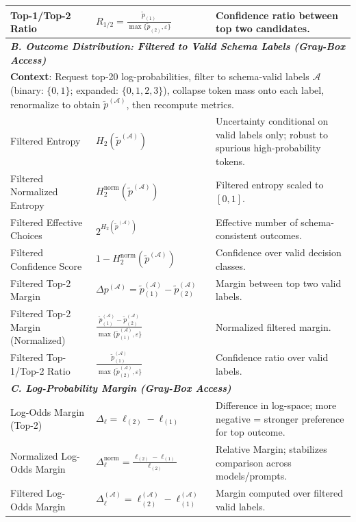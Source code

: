 \begin{table}[t]
\begin{tabular}{p{4.0cm} p{4.8cm} p{8.2cm}}
Top-1/Top-2 Ratio & $R_{1/2} = \frac{\tilde{p}_{(1)}}{\max\{\tilde{p}_{(2)}, \varepsilon\}}$ & Confidence ratio between top two candidates. \\
\midrule
\multicolumn{3}{l}{\textit{\textbf{B. Outcome Distribution: Filtered to Valid Schema Labels (Gray-Box Access)}}} \\
\multicolumn{3}{p{17.0cm}}{\small \textbf{Context}: Request top-20 log-probabilities, filter to schema-valid labels $\mathcal{A}$ (binary: $\{0,1\}$; expanded: $\{0,1,2,3\}$), collapse token mass onto each label, renormalize to obtain $\tilde{p}^{(\mathcal{A})}$, then recompute metrics.} \\[0.5ex]
\hdashline
Filtered Entropy & $H_2(\tilde{p}^{(\mathcal{A})})$ & Uncertainty conditional on valid labels only; robust to spurious high-probability tokens. \\
Filtered Normalized Entropy & $H_2^{\text{norm}}(\tilde{p}^{(\mathcal{A})})$ & Filtered entropy scaled to $[0,1]$. \\
Filtered Effective Choices & $2^{H_2(\tilde{p}^{(\mathcal{A})})}$ & Effective number of schema-consistent outcomes. \\
Filtered Confidence Score & $1 - H_2^{\text{norm}}(\tilde{p}^{(\mathcal{A})})$ & Confidence over valid decision classes. \\
Filtered Top-2 Margin & $\Delta p^{(\mathcal{A})} = \tilde{p}^{(\mathcal{A})}_{(1)} - \tilde{p}^{(\mathcal{A})}_{(2)}$ & Margin between top two valid labels. \\
Filtered Top-2 Margin (Normalized) & $\frac{\tilde{p}^{(\mathcal{A})}_{(1)} - \tilde{p}^{(\mathcal{A})}_{(2)}}{\max\{\tilde{p}^{(\mathcal{A})}_{(1)}, \varepsilon\}}$ & Normalized filtered margin. \\
Filtered Top-1/Top-2 Ratio & $\frac{\tilde{p}^{(\mathcal{A})}_{(1)}}{\max\{\tilde{p}^{(\mathcal{A})}_{(2)}, \varepsilon\}}$ & Confidence ratio over valid labels. \\
\midrule
\multicolumn{3}{l}{\textit{\textbf{C. Log-Probability Margin (Gray-Box Access)}}} \\
\hdashline
Log-Odds Margin (Top-2) & $\Delta_\ell = \ell_{(2)} - \ell_{(1)}$ & Difference in log-space; more negative = stronger preference for top outcome. \\
Normalized Log-Odds Margin & $\Delta_\ell^{\text{norm}} = \frac{\ell_{(2)} - \ell_{(1)}}{\ell_{(2)}}$ & Relative Margin; stabilizes comparison across models/prompts.\\
Filtered Log-Odds Margin & $\Delta_\ell^{(\mathcal{A})} = \ell^{(\mathcal{A})}_{(2)} - \ell^{(\mathcal{A})}_{(1)}$ & Margin computed over filtered valid labels. \\

\end{tabular}
\end{table}
